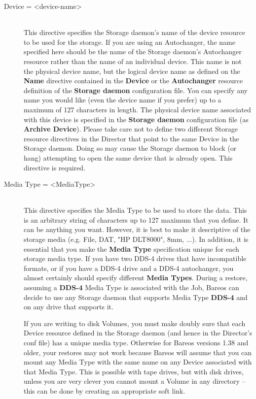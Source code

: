 \begin{description}
\item [Device = {\textless}device-name{\textgreater}] \hfill \\
This directive specifies the Storage daemon's name of the device
resource to be used for the storage.  If you are using an Autochanger,
the name specified here should be the name of the Storage daemon's
Autochanger resource rather than the name of an individual device.  This
name is not the physical device name, but the logical device name as
defined on the {\bf Name} directive contained in the {\bf Device} or the
{\bf Autochanger} resource definition of the {\bf Storage daemon}
configuration file.  You can specify any name you would like (even the
device name if you prefer) up to a maximum of 127 characters in length.
The physical device name associated with this device is specified in the
{\bf Storage daemon} configuration file (as {\bf Archive Device}).
Please take care not to define two different Storage resource directives
in the Director that point to the same Device in the Storage daemon.
Doing so may cause the Storage daemon to block (or hang) attempting to
open the same device that is already open.  This directive is required.

\label{MediaType}
\item [Media Type = {\textless}MediaType{\textgreater}] \hfill \\
This directive specifies the Media Type to be used to store the data.
This is an arbitrary string of characters up to 127 maximum that you
define.  It can be anything you want.  However, it is best to make it
descriptive of the storage media (e.g.  File, DAT, "HP DLT8000", 8mm,
...).  In addition, it is essential that you make the {\bf Media Type}
specification unique for each storage media type.  If you have two DDS-4
drives that have incompatible formats, or if you have a DDS-4 drive and
a DDS-4 autochanger, you almost certainly should specify different {\bf
Media Types}.  During a restore, assuming a {\bf DDS-4} Media Type is
associated with the Job, Bareos can decide to use any Storage daemon
that supports Media Type {\bf DDS-4} and on any drive that supports it.

If you are writing to disk Volumes, you must make doubly sure that each
Device resource defined in the Storage daemon (and hence in the
Director's conf file) has a unique media type.  Otherwise for Bareos
versions 1.38 and older, your restores may not work because Bareos
will assume that you can mount any Media Type with the same name on
any Device associated with that Media Type. This is possible with
tape drives, but with disk drives, unless you are very clever you
cannot mount a Volume in any directory -- this can be done by creating
an appropriate soft link.


\end{description}
